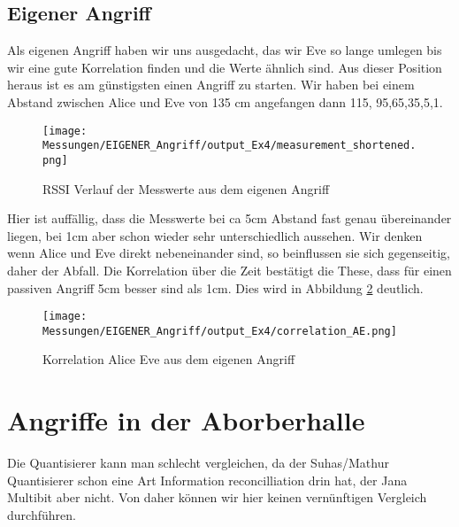 \documentclass[12pt,a4paper]{article}
\begin{document}
\subsection*{Eigener Angriff}
Als eigenen Angriff haben wir uns ausgedacht, das wir Eve so lange umlegen bis wir eine gute Korrelation finden und die Werte ähnlich sind. Aus dieser Position heraus ist es am günstigsten einen Angriff zu starten. Wir haben bei einem Abstand zwischen Alice und Eve von 135 cm angefangen dann 115, 95,65,35,5,1. 
\begin{figure}[H]
\centering
\texttt{[image: Messungen/EIGENER\_Angriff/output\_Ex4/measurement\_shortened.png]}
\caption{RSSI Verlauf der Messwerte aus dem eigenen Angriff}
\label{fig:e1}
\end{figure}
Hier ist auffällig, dass die Messwerte bei ca 5cm Abstand fast genau übereinander liegen, bei 1cm aber schon wieder sehr unterschiedlich aussehen. Wir denken wenn Alice und Eve direkt nebeneinander sind, so beinflussen sie sich gegenseitig, daher der Abfall.
Die Korrelation über die Zeit bestätigt die These, dass für einen passiven Angriff 5cm besser sind als 1cm. Dies wird in Abbildung \ref{fig:e2} deutlich.
\begin{figure}[H]
\centering
\texttt{[image: Messungen/EIGENER\_Angriff/output\_Ex4/correlation\_AE.png]}
\caption{Korrelation Alice Eve aus dem eigenen Angriff}
\label{fig:e2}
\end{figure}
\section{Angriffe in der Aborberhalle}
Die Quantisierer kann man schlecht vergleichen, da der Suhas/Mathur Quantisierer schon eine Art Information reconcilliation drin hat, der Jana Multibit aber nicht. Von daher können wir hier keinen vernünftigen Vergleich durchführen.
\end{document}

